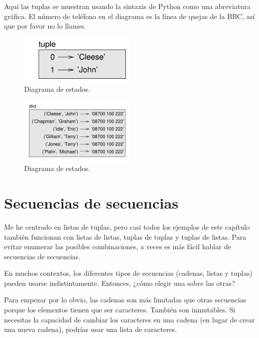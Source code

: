 Aquí las tuplas se muestran usando la sintaxis de Python como una abreviatura gráfica. El número de teléfono en el diagrama es la línea de quejas de la BBC, así que por favor no lo llames.

\begin{figure}[h]
        \centering
        \includegraphics[width=0.5\textwidth]{./images/chapter_12_1.png}
        \caption{Diagrama de estados.}
        \label{fig:12_1}
        \end{figure}
        
\begin{figure}[h]
        \centering
        \includegraphics[width=0.5\textwidth]{./images/chapter_12_2.png}
        \caption{Diagrama de estados.}
        \label{fig:12_2}
        \end{figure}

\section{Secuencias de secuencias}

Me he centrado en listas de tuplas, pero casi todos los ejemplos de este capítulo también funcionan con listas de listas, tuplas de tuplas y tuplas de listas. Para evitar enumerar las posibles combinaciones, a veces es más fácil hablar de secuencias de secuencias.

En muchos contextos, los diferentes tipos de secuencias (cadenas, listas y tuplas) pueden usarse indistintamente. Entonces, ¿cómo elegir una sobre las otras?

Para empezar por lo obvio, las cadenas son más limitadas que otras secuencias porque los elementos tienen que ser caracteres. También son inmutables. Si necesitas la capacidad de cambiar los caracteres en una cadena (en lugar de crear una nueva cadena), podrías usar una lista de caracteres.

